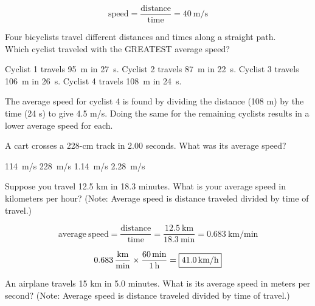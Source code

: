 \documentclass[]{exam}
\begin{document}
\begin{questions}
\begin{questions}
\begin{solution}
\begin{equation*}
    \text{speed} = \frac{\text{distance}}{\text{time}} = \SI{40}{\meter/\second}
\end{equation*}
\end{solution}

\question
Four bicyclists travel different distances and times along a straight path. \\
Which cyclist traveled with the GREATEST average speed?

\begin{choices}
\choice Cyclist 1 travels \SI{95}{m} in \SI{27}{s}.
\choice Cyclist 2 travels \SI{87}{m} in \SI{22}{s}.
\choice Cyclist 3 travels \SI{106}{m} in \SI{26}{s}.
\CorrectChoice Cyclist 4 travels \SI{108}{m} in \SI{24}{s}.
\end{choices}

\begin{solution}
The average speed for cyclist 4 is found by dividing the distance (108 m) by the time (24 s) to give 4.5 m/s. Doing the same for the remaining cyclists results in a lower average speed for each.
\end{solution}


\question
A cart crosses a 228-cm track in 2.00 seconds. What was its average speed?

\begin{choices}
    \choice \SI{114}{m/s}
    \choice \SI{228}{m/s}
    \correctchoice \SI{1.14}{m/s}
    \choice \SI{2.28}{m/s}
\end{choices}

\question
Suppose you travel 12.5 km in 18.3 minutes. What is your average speed in kilometers per hour? (Note: Average speed is distance traveled divided by time of travel.)

\begin{solution}
\begin{equation*}
    \mathrm{average\ speed = \frac{distance}{time}} = \frac{\SI{12.5}{\kilo\meter}}{\SI{18.3}{\minute}} = \SI[per-mode=fraction]{0.683}{\kilo\meter\per\minute}
\end{equation*}

\begin{equation*}
    \SI[per-mode=fraction]{0.683}{\kilo\meter\per\minute} \times \frac{\SI{60}{\min}}{\SI{1}{\hour}} = \framebox{\SI{41.0}{\kilo\meter/\hour}}
\end{equation*}
\end{solution}

\question
An airplane travels 15 km in 5.0 minutes. What is its average speed in meters per second? (Note: Average speed is distance traveled divided by time of travel.)


\end{questions}
\end{questions}
\end{document}
